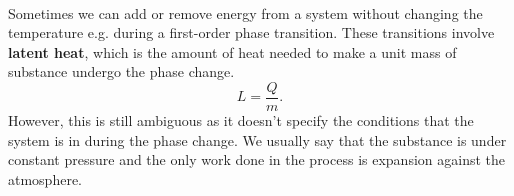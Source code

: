 \documentclass[../thermodynamics.tex]{subfiles}
\begin{document}
        \paragraph{}
        Sometimes we can add or remove energy from a system without changing the temperature e.g. during a first-order phase transition.
        These transitions involve \textbf{latent heat}, which is the amount of heat needed to make a unit mass of substance undergo the phase change.
        \begin{equation}
            L=\frac{Q}{m}.
        \end{equation}
        However, this is still ambiguous as it doesn't specify the conditions that the system is in during the phase change.
        We usually say that the substance is under constant pressure and the only work done in the process is expansion against the atmosphere.
\end{document}
